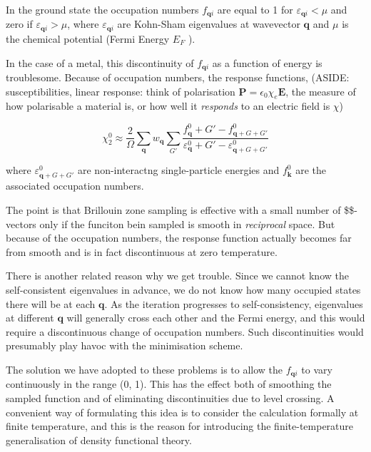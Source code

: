 \documentclass[11pt]{article}
\begin{document}
\begin{enumerate}
\begin{enumerate}
In the ground state the occupation numbers \(f_{\mathbf{q}i}\) are equal to 1
for \(\varepsilon_{\mathbf{q} i} < \mu\) and zero if \(\varepsilon_{\mathbf{q} i}
> \mu\), where \(\varepsilon_{\mathbf{q} i}\) are Kohn-Sham eigenvalues at
wavevector \(\mathbf{q}\) and \(\mu\) is the chemical potential (Fermi Energy
\(E_F\) ).

In the case of a metal, this discontinuity of \(f_{\mathbf{q}i}\) as a function
of energy is troublesome. Because of occupation numbers, the response
functions, (ASIDE: susceptibilities, linear response: think of polarisation
\(\mathbf{P} = \epsilon_0 \chi_{e} \mathbf{E}\), the measure of how
polarisable a material is, or how well it \emph{responds} to an electric field is
\(\chi\)) 

\begin{equation}
\chi_2^0 \approx \frac{2}{\Omega} \sum_{\mathbf{q}} w_{\mathbf{q}}\sum_{G'} 
     \frac{ f_{\mathbf{q}}^0 + G'  - f_{\mathbf{q} + G + G'}^0
     }{\varepsilon_{\mathbf{q}}^0 +  G'  - \varepsilon_{\mathbf{q} + G + G'}^0 }
\end{equation}

where \(\varepsilon_{\mathbf{q} + G + G'}^0\) are non-interactng single-particle
energies and \(f_{\mathbf{k}}^0\) are the associated occupation numbers. 

The point is that Brillouin zone sampling is effective with a small number of
\$\$-vectors only if the funciton bein sampled is smooth in
\emph{reciprocal} space. But because of the occupation numbers, the response
function actually becomes far from smooth and is in fact discontinuous at zero
temperature. 

There is another related reason why we get trouble. Since we cannot know the
self-consistent eigenvalues in advance, we do not know how many occupied states
there will be at each \(\mathbf{q}\). As the iteration progresses to self-consistency, eigenvalues at
different \(\mathbf{q}\) will generally cross each other and the Fermi energy, and this would require
a discontinuous change of occupation numbers. Such discontinuities would presumably
play havoc with the minimisation scheme. 

The solution we have adopted to these problems is to allow the \(f_{\mathbf{q}i}\) to vary
continuously in the range (0, 1). This has the effect both of smoothing the sampled
function and of eliminating discontinuities due to level crossing. A convenient way of
formulating this idea is to consider the calculation formally at finite temperature, and
this is the reason for introducing the finite-temperature generalisation of
density functional theory. 


\end{enumerate}
\end{enumerate}
\end{document}
